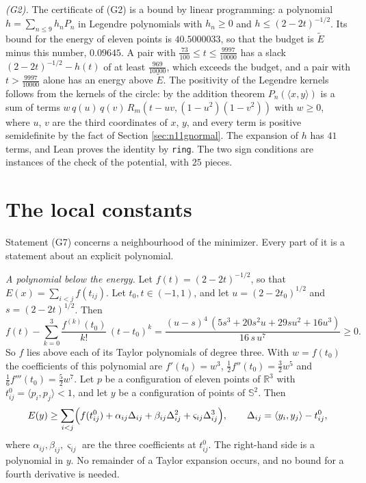 \documentclass[reqno,a4paper,11pt]{amsart}
\numberwithin{equation}{section}
\def\R{{\mathbb R}}
\newcommand{\Sph}{\mathbb{S}}
\newcommand{\lean}[1]{\texttt{#1}}
\newcommand{\factNrgLpBound}{40.5000033}
\newcommand{\factNrgLpBudget}{0.09645}
\newcommand{\factNrgLpDegree}{9}
\newcommand{\factNrgLpPieces}{25}
\newcommand{\factNrgLpTerms}{41}
\begin{document}
\emph{(G2).} The certificate of (G2) is a bound by linear programming: a polynomial $h = \sum_{n \leq \factNrgLpDegree} h_n P_n$ in Legendre polynomials with $h_n \geq 0$ and $h \leq (2-2t)^{-1/2}$. Its bound for the energy of eleven points is $\factNrgLpBound$, so that the budget is $\tilde E$ minus this number, $\factNrgLpBudget$. A pair with $\tfrac{73}{100} \leq t \leq \tfrac{9997}{10000}$ has a slack $(2-2t)^{-1/2} - h(t)$ of at least $\tfrac{969}{10000}$, which exceeds the budget, and a pair with $t > \tfrac{9997}{10000}$ alone has an energy above $\tilde E$. The positivity of the Legendre kernels follows from the kernels of the circle: by the addition theorem $P_n(\langle x, y \rangle)$ is a sum of terms $w \, q(u) \, q(v) \, R_m(t - uv, (1-u^2)(1-v^2))$ with $w \geq 0$, where $u$, $v$ are the third coordinates of $x$, $y$, and every term is positive semidefinite by the fact of Section \ref{sec:n11gnormal}. The expansion of $h$ has $\factNrgLpTerms$ terms, and Lean proves the identity by \lean{ring}. The two sign conditions are instances of the check of the potential, with $\factNrgLpPieces$ pieces.

\section{The local constants}\label{sec:n11glocal}

Statement (G7) concerns a neighbourhood of the minimizer. Every part of it is a statement about an explicit polynomial.

\emph{A polynomial below the energy.} Let $f(t) = (2 - 2t)^{-1/2}$, so that $E(x) = \sum_{i<j} f(t_{ij})$. Let $t_0, t \in (-1, 1)$, and let $u = (2 - 2t_0)^{1/2}$ and $s = (2 - 2t)^{1/2}$. Then
\begin{equation}\label{eq:n11minorant}
f(t) - \sum_{k=0}^{3} \frac{f^{(k)}(t_0)}{k!} \, (t - t_0)^k = \frac{(u - s)^4 \, (5 s^3 + 20 s^2 u + 29 s u^2 + 16 u^3)}{16 \, s \, u^7} \geq 0 .
\end{equation}
So $f$ lies above each of its Taylor polynomials of degree three. With $w = f(t_0)$ the coefficients of this polynomial are $f'(t_0) = w^3$, $\tfrac12 f''(t_0) = \tfrac32 w^5$ and $\tfrac16 f'''(t_0) = \tfrac52 w^7$. Let $p$ be a configuration of eleven points of $\R^3$ with $t^0_{ij} = \langle p_i, p_j \rangle < 1$, and let $y$ be a configuration of points of $\Sph^2$. Then
$$
E(y) \geq \sum_{i<j} \Bigl( f(t^0_{ij}) + \alpha_{ij} \Delta_{ij} + \beta_{ij} \Delta_{ij}^2 + \varsigma_{ij} \Delta_{ij}^3 \Bigr), \qquad \Delta_{ij} = \langle y_i, y_j \rangle - t^0_{ij} ,
$$
where $\alpha_{ij}, \beta_{ij}, \varsigma_{ij}$ are the three coefficients at $t^0_{ij}$. The right-hand side is a polynomial in $y$. No remainder of a Taylor expansion occurs, and no bound for a fourth derivative is needed.
\end{document}
